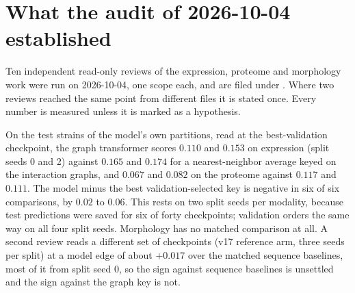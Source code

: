 
\section{What the audit of 2026-10-04 established}
\label{sec:review}

Ten independent read-only reviews of the expression, proteome and morphology work were run
on 2026-10-04, one scope each, and are filed under . Where two
reviews reached the same point from different files it is stated once. Every number is
measured unless it is marked as a hypothesis.

 On the test
strains of the model's own partitions, read at the best-validation checkpoint, the graph
transformer scores $0.110$ and $0.153$ on expression (split seeds 0 and 2) against $0.165$
and $0.174$ for a nearest-neighbor average keyed on the interaction graphs, and $0.067$ and
$0.082$ on the proteome against $0.117$ and $0.111$. The model minus the best
validation-selected key is negative in six of six comparisons, by $0.02$ to $0.06$. This
rests on two split seeds per modality, because test predictions were saved for six of forty
checkpoints; validation orders the same way on all four split seeds. Morphology has no
matched comparison at all. A second review reads a different set of checkpoints (v17
reference arm, three seeds per split) at a model edge of about $+0.017$ over the matched
sequence baselines, most of it from split seed 0, so the sign against sequence baselines is
unsettled and the sign against the graph key is not.

